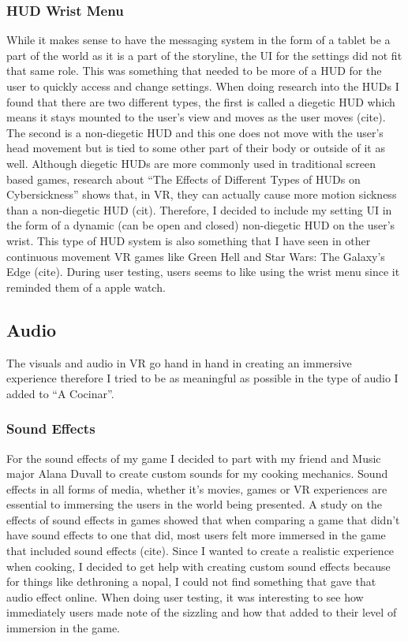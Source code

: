 \documentclass[10pt,twocolumn]{article}
\begin{document}
\subsubsection{HUD Wrist Menu}
While it makes sense to have the messaging system in the form of a tablet be a part of the world as it is a part of the storyline, the UI for the settings did not fit that same role. This was something that needed to be more of a HUD for the user to quickly access and change settings. When doing research into the HUDs I found that there are two different types, the first is called a diegetic HUD which means it stays mounted to the user's view and moves as the user moves (cite). The second is a non-diegetic HUD and this one does not move with the user’s head movement but is tied to some other part of their body or outside of it as well. Although diegetic HUDs are more commonly used in traditional screen based games, research about “The Effects of Different Types of HUDs on Cybersickness” shows that, in VR, they can actually cause more motion sickness than a non-diegetic HUD (cit). Therefore, I decided to include my setting UI in the form of a dynamic (can be open and closed) non-diegetic HUD on the user's wrist. This type of HUD system is also something that I have seen in other continuous movement VR games like Green Hell and Star Wars: The Galaxy’s Edge (cite). During user testing, users seems to like using the wrist menu since it reminded them of a apple watch. 

\subsection{Audio}
The visuals and audio in VR go hand in hand in creating an immersive experience therefore I tried to be as meaningful as possible in the type of audio I added to “A Cocinar”.

\subsubsection{Sound Effects}
For the sound effects of my game I decided to part with my friend and Music major Alana Duvall to create custom sounds for my cooking mechanics. Sound effects in all forms of media, whether it’s movies, games or VR experiences are essential to immersing the users in the world being presented. A study on the effects of sound effects in games showed that when comparing a game that didn’t have sound effects to one that did, most users felt more immersed in the game that included sound effects (cite). Since I wanted to create a realistic experience when cooking, I decided to get help with creating custom sound effects because for things like dethroning a nopal, I could not find something that gave that audio effect online. When doing user testing, it was interesting to see how immediately users made note of the sizzling and how that added to their level of immersion in the game.
\end{document}
